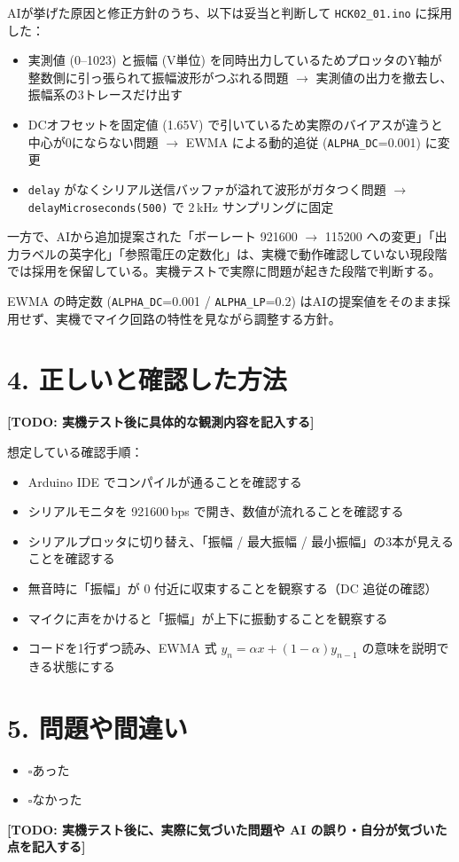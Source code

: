 \documentclass[a4paper,11pt,dvipdfmx]{jsarticle}
\newcommand{\cboxoff}{$\square$}
\newcommand{\todo}[1]{\textbf{[TODO: #1]}}
\begin{document}
AIが挙げた原因と修正方針のうち、以下は妥当と判断して \texttt{HCK02\_01.ino} に採用した：
\begin{itemize}
  \item 実測値 (0--1023) と振幅 (V単位) を同時出力しているためプロッタのY軸が整数側に引っ張られて振幅波形がつぶれる問題 $\rightarrow$ 実測値の出力を撤去し、振幅系の3トレースだけ出す
  \item DCオフセットを固定値 (1.65V) で引いているため実際のバイアスが違うと中心が0にならない問題 $\rightarrow$ EWMA による動的追従 (\texttt{ALPHA\_DC}=0.001) に変更
  \item \texttt{delay} がなくシリアル送信バッファが溢れて波形がガタつく問題 $\rightarrow$ \texttt{delayMicroseconds(500)} で 2\,kHz サンプリングに固定
\end{itemize}
一方で、AIから追加提案された「ボーレート 921600 $\rightarrow$ 115200 への変更」「出力ラベルの英字化」「参照電圧の定数化」は、実機で動作確認していない現段階では採用を保留している。実機テストで実際に問題が起きた段階で判断する。

EWMA の時定数 (\texttt{ALPHA\_DC}=0.001 / \texttt{ALPHA\_LP}=0.2) はAIの提案値をそのまま採用せず、実機でマイク回路の特性を見ながら調整する方針。

\section*{4. 正しいと確認した方法}
\todo{実機テスト後に具体的な観測内容を記入する}

想定している確認手順：
\begin{itemize}
  \item Arduino IDE でコンパイルが通ることを確認する
  \item シリアルモニタを 921600\,bps で開き、数値が流れることを確認する
  \item シリアルプロッタに切り替え、「振幅 / 最大振幅 / 最小振幅」の3本が見えることを確認する
  \item 無音時に「振幅」が 0 付近に収束することを観察する（DC 追従の確認）
  \item マイクに声をかけると「振幅」が上下に振動することを観察する
  \item コードを1行ずつ読み、EWMA 式 $y_n = \alpha x + (1-\alpha) y_{n-1}$ の意味を説明できる状態にする
\end{itemize}

\section*{5. 問題や間違い}
\begin{itemize}
  \item \cboxoff あった
  \item \cboxoff なかった
\end{itemize}
\todo{実機テスト後に、実際に気づいた問題や AI の誤り・自分が気づいた点を記入する}
\end{document}
